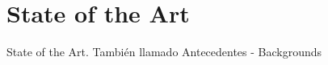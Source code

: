 \chapter{State of the Art} %
\label{chap:state_of_the_art}

State of the Art. También llamado
Antecedentes - Backgrounds








